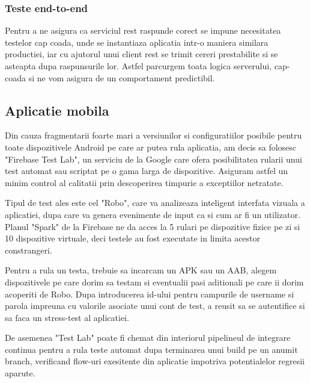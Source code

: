 \subsubsection {Teste end-to-end}

Pentru a ne asigura ca serviciul \acrshort{rest} raspunde corect se impune necesitatea testelor cap coada, unde se instantiaza aplicatia intr-o maniera similara productiei, iar cu ajutorul unui client rest se trimit cereri prestabilite si se asteapta dupa raspunsurile lor. Astfel parcurgem toata logica serverului, cap-coada si ne vom asigura de un comportament predictibil.

\subsection {Aplicatie mobila}

Din cauza fragmentarii foarte mari a versiunilor si configuratiilor posibile pentru toate dispozitivele Android pe care ar putea rula aplicatia, am decis sa folosesc "Firebase Test Lab", un serviciu de la Google care ofera posibilitatea rularii unui test automat sau scriptat pe o gama larga de dispozitive. 
Asiguram astfel un minim control al calitatii prin descoperirea timpurie a exceptiilor netratate.

Tipul de test ales este cel "Robo", care va analizeaza inteligent interfata vizuala a aplicatiei, dupa care va genera evenimente de input ca si cum ar fi un utilizator. Planul "Spark" de la Firebase ne da acces la 5 rulari pe dispozitive fizice pe zi si 10 dispozitive virtuale, deci testele au fost executate in limita acestor constrangeri. 

Pentru a rula un testa, trebuie sa incarcam un APK sau un AAB, alegem dispozitivele pe care dorim sa testam si eventualii pasi aditionali pe care ii dorim acoperiti de Robo. Dupa introducerea id-ului pentru campurile de username si parola impreuna cu valorile asociate unui cont de test, a reusit sa se autentifice si sa faca un stress-test al aplicatiei.


De asemenea "Test Lab" poate fi chemat din interiorul pipelineul de integrare continua pentru a rula teste automat dupa terminarea unui build pe un anumit branch, verificand flow-uri exesitente din aplicatie impotriva potentialelor regresii aparute.